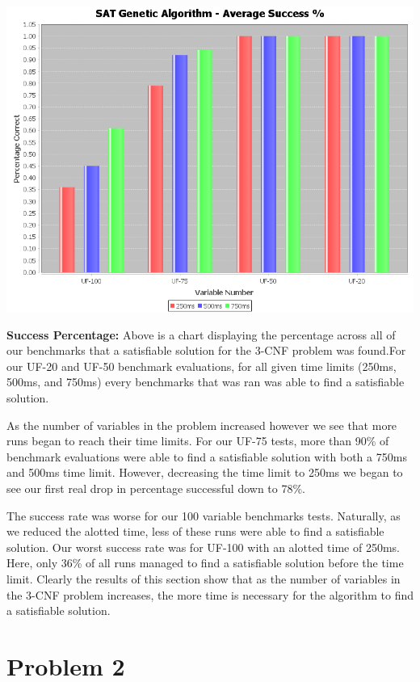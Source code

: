\documentclass[10pt,a4paper]{article}
\begin{document}
	\begin{center}
		\includegraphics[scale=0.35]{average_success}
	\end{center}
	
	\textbf{Success Percentage:} Above is a chart displaying the percentage across all of our benchmarks that a satisfiable solution for the 3-CNF problem was found.For our UF-20 and UF-50 benchmark evaluations, for all given time limits (250ms, 500ms, and 750ms) every benchmarks that was ran was able to find a satisfiable solution.
	
	As the number of variables in the problem increased however we see that more runs began to reach their time limits. For our UF-75 tests, more than 90\% of benchmark evaluations were able to find a satisfiable solution with both a 750ms and 500ms time limit. However, decreasing the time limit to 250ms we began to see our first real drop in percentage successful down to 78\%.
	
	The success rate was worse for our 100 variable benchmarks tests. Naturally, as we reduced the alotted time, less of these runs were able to find a satisfiable solution. Our worst success rate was for UF-100 with an alotted time of 250ms. Here, only 36\% of all runs managed to find a satisfiable solution before the time limit. Clearly the results of this section show that as the number of variables in the 3-CNF problem increases, the more time is necessary for the algorithm to find a satisfiable solution.
	
	\section*{Problem 2}
	
\end{document}
